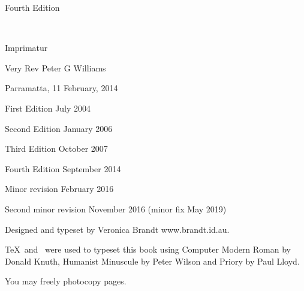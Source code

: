 \centerline{Fourth Edition}

\bigskip

\eject




\ 

\vfill

{\raggedright
{}

\parindent=0mm
\parskip=6pt

Imprimatur
\centerline{Very Rev Peter G Williams}
\rmlyrics

Parramatta, 11 February, 2014

\vfill

First Edition July 2004

Second Edition January 2006

Third Edition October 2007


Fourth Edition September 2014

\qquad Minor revision February 2016

\qquad Second minor revision November 2016 (minor fix May 2019)

Designed and typeset by Veronica Brandt www.brandt.id.au.

\TeX\ and \OpusTeX\ were used to typeset this book using
          Computer Modern Roman by Donald Knuth,
          Humanist Minuscule by Peter Wilson
          and Priory by Paul Lloyd.



You may freely photocopy pages.


}
